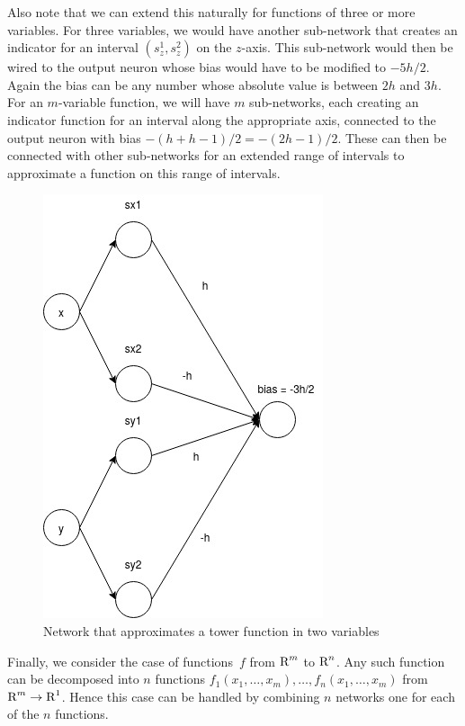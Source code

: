 Also note that we can extend this naturally for functions of three or more variables. For three 
variables, we would have another sub-network that creates an indicator for an interval 
$(s_z^1, s_z^2)$ on the $z$-axis. This sub-network would then be wired to the output neuron whose
bias would have to be modified to $-5h/2$. Again the bias can be any number whose absolute value 
is between $2h$ and $3h$. For an $m$-variable function, we will have $m$ sub-networks, each 
creating an indicator function for an interval along the appropriate axis, connected 
to the output neuron with bias $- (h + h - 1)/2 = - (2h - 1) / 2$. These can then be connected 
with other sub-networks for an extended range of intervals to approximate a function on this
range of intervals.     
\begin{figure}[ht]
\begin{center}
\includegraphics[scale=0.5]{TowerFunction.jpg}
\end{center}
\caption{Network that approximates a tower function in two variables}
\label{fig:tower_function}
\end{figure}

Finally, we consider the case of functions~$f$ from $\text{R}^m$ to $\text{R}^n$. Any such function can be 
decomposed into $n$ functions $f_1(x_1, \ldots, x_m), \ldots, f_n(x_1, \ldots, x_m)$ 
from $\text{R}^m \to \text{R}^1$. Hence this case can be handled by combining 
$n$ networks one for each of the $n$ functions.  



